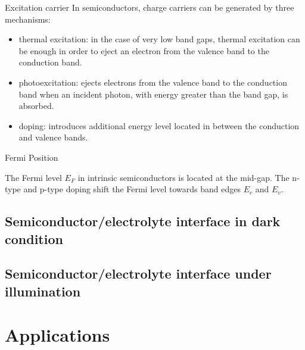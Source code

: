 \documentclass[10pt,compress]{beamer}
\begin{document}
    \begin{frame}[allowframebreaks=1.0]{Excitation carrier}
        In semiconductors, charge carriers can be generated by three mechanisms: 
        \begin{itemize}
            \item thermal excitation: in the case of very low band gaps, thermal excitation can be enough in order 
            to eject an electron from the valence band to the conduction band.
            \item photoexcitation: ejects electrons from the valence band to the conduction 
            band when an incident photon, with energy greater than the band gap, is absorbed.
            \item doping: introduces additional energy level located in between the conduction and 
            valence bands.
        \end{itemize}
        
        

    \end{frame}

    \begin{frame}{Fermi Position}
        
        The Fermi level $E_F$ in intrinsic semiconductors is located at the mid-gap. 
        The n-type and p-type doping shift the Fermi level towards band edges 
        $E_c$ and $E_v$.
    \end{frame}

\subsection{Semiconductor/electrolyte interface in dark condition}

\subsection{Semiconductor/electrolyte interface under illumination}


\section{Applications}
\end{document}
